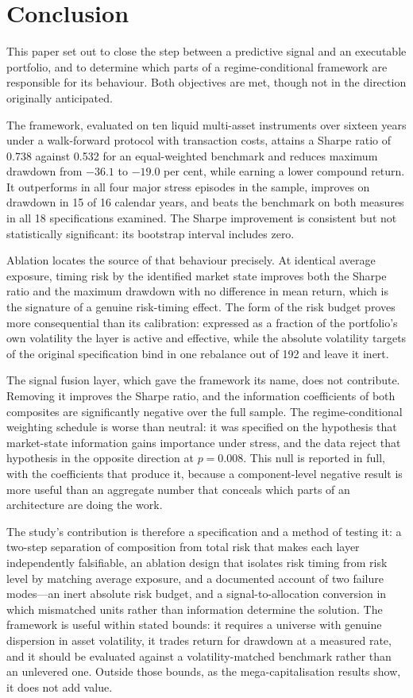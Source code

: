 \section{Conclusion}
\label{sec:conclusion}

This paper set out to close the step between a predictive signal and an executable
portfolio, and to determine which parts of a regime-conditional framework are
responsible for its behaviour. Both objectives are met, though not in the direction
originally anticipated.

The framework, evaluated on ten liquid multi-asset instruments over sixteen years under
a walk-forward protocol with transaction costs, attains a Sharpe ratio of 0.738 against
0.532 for an equal-weighted benchmark and reduces maximum drawdown from $-36.1$ to
$-19.0$ per cent, while earning a lower compound return. It outperforms in all four
major stress episodes in the sample, improves on drawdown in 15 of 16 calendar years,
and beats the benchmark on both measures in all 18 specifications examined. The Sharpe
improvement is consistent but not statistically significant: its bootstrap interval
includes zero.

Ablation locates the source of that behaviour precisely. At identical average exposure,
timing risk by the identified market state improves both the Sharpe ratio and the
maximum drawdown with no difference in mean return, which is the signature of a genuine
risk-timing effect. The form of the risk budget proves more consequential than its
calibration: expressed as a fraction of the portfolio's own volatility the layer is
active and effective, while the absolute volatility targets of the original
specification bind in one rebalance out of 192 and leave it inert.

The signal fusion layer, which gave the framework its name, does not contribute.
Removing it improves the Sharpe ratio, and the information coefficients of both
composites are significantly negative over the full sample. The regime-conditional
weighting schedule is worse than neutral: it was specified on the hypothesis that
market-state information gains importance under stress, and the data reject that
hypothesis in the opposite direction at $p = 0.008$. This null is reported in full,
with the coefficients that produce it, because a component-level negative result is more
useful than an aggregate number that conceals which parts of an architecture are doing
the work.

The study's contribution is therefore a specification and a method of testing it: a
two-step separation of composition from total risk that makes each layer independently
falsifiable, an ablation design that isolates risk timing from risk level by matching
average exposure, and a documented account of two failure modes---an inert absolute risk
budget, and a signal-to-allocation conversion in which mismatched units rather than
information determine the solution. The framework is useful within stated bounds: it
requires a universe with genuine dispersion in asset volatility, it trades return for
drawdown at a measured rate, and it should be evaluated against a volatility-matched
benchmark rather than an unlevered one. Outside those bounds, as the mega-capitalisation
results show, it does not add value.

